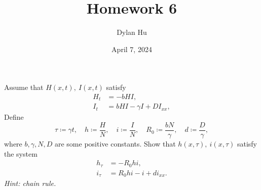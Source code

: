 \documentclass[plain]{pset}
\title{Homework 6}
\author{Dylan Hu}
\date{April 7, 2024}
\begin{document}
\begin{multicols}{2}
    \raggedcolumns{}
    \maketitle
    \columnbreak{}
    \tableofcontents
\end{multicols}

\setlength{\parskip}{1em}
\setlength{\parindent}{0pt}

\pagebreak

\begin{problem}
Assume that \(H(x, t),\ I(x,t)\) satisfy
\begin{align*}
    H_t & = -bHI,                     \\
    I_t & = bHI - \gamma I + DI_{xx},
\end{align*}
Define
\[\tau \coloneqq \gamma t, \quad h \coloneqq \frac{H}{N}, \quad i \coloneqq \frac{I}{N}, \quad R_0 \coloneqq \frac{bN}{\gamma}, \quad d \coloneqq \frac{D}{\gamma},\]
where \(b, \gamma, N, D\) are some positive constants. Show that \(h(x,\tau),\ i(x, \tau)\) satisfy the system
\begin{align*}
    h_\tau & = -R_0hi,              \\
    i_\tau & = R_0hi - i + di_{xx}.
\end{align*}
\textit{Hint: chain rule.}
\end{problem}
\end{document}
